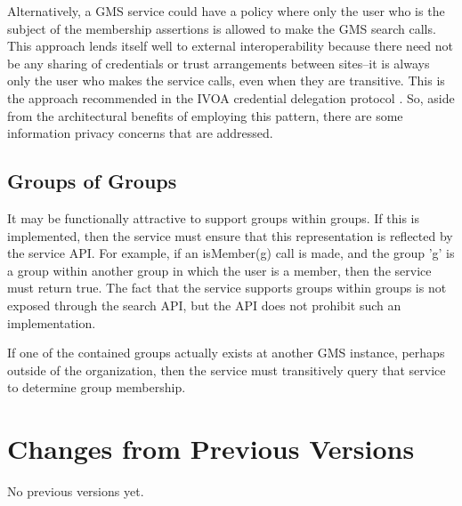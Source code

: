 \documentclass[11pt,a4paper]{ivoa}
\begin{document}
Alternatively, a GMS service could have a policy where only the user who is the subject of the membership assertions is allowed to make the GMS search calls.  This approach lends itself well to external interoperability because there need not be any sharing of credentials or trust arrangements between sites--it is always only the user who makes the service calls, even when they are transitive.  This is the approach recommended in the  IVOA credential delegation protocol \citep{std:CDP}.  So, aside from the architectural benefits of employing this pattern, there are some information privacy concerns that are addressed.

\subsection{Groups of Groups}

It may be functionally attractive to support groups within groups.  If this is implemented, then the service must ensure that this representation is reflected by the service API.  For example, if an isMember(g) call is made, and the group 'g' is a group within another group in which the user is a member, then the service must return true.  The fact that the service supports groups within groups is not exposed through the search API, but the API does not prohibit such an implementation.

If one of the contained groups actually exists at another GMS instance, perhaps outside of the organization, then the service must transitively query that service to determine group membership.

\appendix

\section{Changes from Previous Versions}

No previous versions yet.


\end{document}
